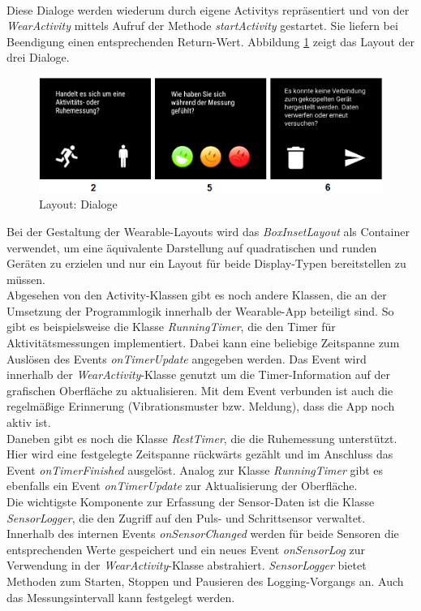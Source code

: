 \\[0.5cm]
Diese Dialoge werden wiederum durch eigene Activitys repräsentiert und von der \textit{WearActivity} mittels Aufruf der Methode \textit{startActivity} gestartet. Sie liefern bei Beendigung einen entsprechenden Return-Wert. Abbildung \ref{fig:layout_dialogs} zeigt das Layout der drei Dialoge.
\bigskip
\begin{figure}[H]
	\centering
	\includegraphics[scale=0.53]{images/layout_dialogs.png}
	\caption{Layout: Dialoge}
	\label{fig:layout_dialogs}
\end{figure}
\bigskip
Bei der Gestaltung der Wearable-Layouts wird das \textit{BoxInsetLayout} als Container verwendet, um eine äquivalente Darstellung auf quadratischen und runden Geräten zu erzielen und nur ein Layout für beide Display-Typen bereitstellen zu müssen. 
\\[0.5cm]
Abgesehen von den Activity-Klassen gibt es noch andere Klassen, die an der Umsetzung der Programmlogik innerhalb der Wearable-App beteiligt sind. So gibt es beispielsweise die Klasse \textit{RunningTimer}, die den Timer für Aktivitätsmessungen implementiert. Dabei kann eine beliebige Zeitspanne zum Auslösen des Events \textit{onTimerUpdate} angegeben werden. Das Event wird innerhalb der \textit{WearActivity}-Klasse genutzt um die Timer-Information auf der grafischen Oberfläche zu aktualisieren. Mit dem Event verbunden ist auch die regelmäßige Erinnerung (Vibrationsmuster bzw. Meldung), dass die App noch aktiv ist.
\\[0.5cm]
Daneben gibt es noch die Klasse \textit{RestTimer}, die die Ruhemessung unterstützt. Hier wird eine festgelegte Zeitspanne rückwärts gezählt und im Anschluss das Event \textit{onTimerFinished} ausgelöst. Analog zur Klasse \textit{RunningTimer} gibt es ebenfalls ein Event \textit{onTimerUpdate} zur Aktualisierung der Oberfläche.
\\[0.5cm]
Die wichtigste Komponente zur Erfassung der Sensor-Daten ist die Klasse \textit{SensorLogger}, die den Zugriff auf den Puls- und Schrittsensor verwaltet. Innerhalb des internen Events \textit{onSensorChanged} werden für beide Sensoren die entsprechenden Werte gespeichert und ein neues Event \textit{onSensorLog} zur Verwendung in der \textit{WearActivity}-Klasse abstrahiert. \textit{SensorLogger} bietet Methoden zum Starten, Stoppen und Pausieren des Logging-Vorgangs an. Auch das Messungsintervall kann festgelegt werden.
